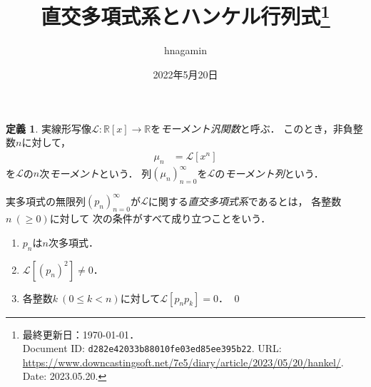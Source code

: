 \documentclass{jlreq}
\theoremstyle{definition}
\newtheorem{definition}[theorem]{定義}
\newcommand{\functype}[3]{#1\colon#2\longrightarrow#3}
\newcommand{\mcL}{\mathcal{L}}
\newcommand{\polynoms}[2]{#1[#2]}
\newcommand{\realnums}{\mathbb{R}}
\newcommand{\sequence}[3]{\sequenceparen{#1}{#2}{#3}{(}{)}} %
\newcommand{\sequenceparen}[5]{{#4#1#5}_{#2}^{#3}}
\begin{document}
\title{直交多項式系とハンケル行列式\thanks{%
  最終更新日：{\today}．\\
  Document ID: \texttt{d282e42033b88010fe03ed85ee395b22}.
  URL: \url{https://www.downcastingsoft.net/7e5/diary/article/2023/05/20/hankel/}.
  Date: 2023.05.20.
}}
\author{hnagamin}
\date{2022年5月20日}
\maketitle

\begin{definition}
  実線形写像\(\functype{\mcL}{\polynoms{\realnums}{x}}{\realnums}\)を\emph{モーメント汎関数}と呼ぶ．
  このとき，非負整数\(n\)に対して，
  \begin{align}
    \mu_n &= \mcL[x^n]
  \end{align}
  を\(\mcL\)の\(n\)次\emph{モーメント}という．
  列\(\sequence{\mu_n}{n=0}{\infty}\)を\(\mcL\)の\emph{モーメント列}という．

  実多項式の無限列\(\sequence{p_n}{n=0}{\infty}\)が\(\mcL\)に関する\emph{直交多項式系}であるとは，
  各整数\(n\:(\ge0)\)に対して
  次の条件がすべて成り立つことをいう．
  \begin{enumerate}
    \item \(p_n\)は\(n\)次多項式．
    \item \(\mcL[(p_n)^2]\neq0\)．
    \item 各整数\(k\:(0\le k<n)\)に対して\(\mcL[p_n p_k]=0\)．
    \qed
  \end{enumerate}
\end{definition}
\end{document}
